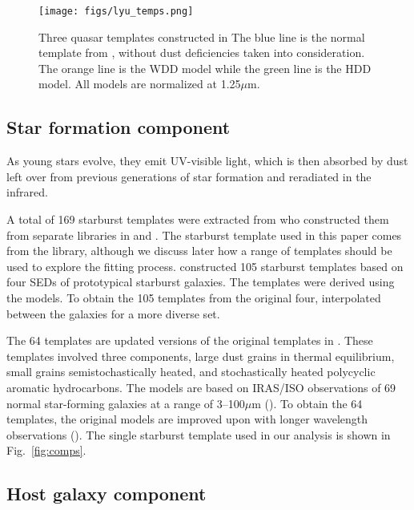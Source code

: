 \begin{figure}[t]
  \centering
  \texttt{[image: figs/lyu\_temps.png]}
  \caption{Three quasar templates constructed in \cite{lyu2017feb} The blue line is the normal template from \cite{elvis1994}, 
           without dust deficiencies taken into consideration. The orange line is the WDD model while the green line is the 
           HDD model. All models are normalized at 1.25$\mu$m.
         }
         \label{fig:lyu}
\end{figure}
  
\subsection{Star formation component}
\label{sec:star}

As young stars evolve, they emit UV-visible light, which is then absorbed by dust left over from previous 
generations of star formation and reradiated in the infrared. 

A total of 169 starburst templates were extracted from \cite{rivera2016} who constructed them from separate libraries 
in \cite{charyelbaz2001} and \cite{dalehelou2002}. The starburst template used in this paper comes from the 
\cite{dalehelou2002} library, although we discuss later how a range of templates should be used to explore the fitting process.
\cite{charyelbaz2001} constructed 105 starburst templates based on four SEDs of prototypical starburst galaxies. The templates 
were derived using the \cite{silva1998} models. To obtain the 105 templates from the original four, \cite{dalehelou2001} 
interpolated between the galaxies for a more diverse set.

The 64 \cite{dalehelou2002} templates are updated versions of the original templates in \cite{dalehelou2001}. These 
templates involved three components, large dust grains in thermal equilibrium, small grains semistochastically heated, and stochastically 
heated polycyclic aromatic hydrocarbons. The models are based on IRAS/ISO observations of 69 normal star-forming galaxies at a range 
of 3--100$\mu$m (\cite{rivera2016}). To obtain the 64 templates, the original models are improved upon with longer 
wavelength observations (\citealp{dalehelou2002}). The single starburst template used in our analysis is shown in Fig.~\ref{fig:comps}. 

\subsection{Host galaxy component}
\label{sec:galaxy}


